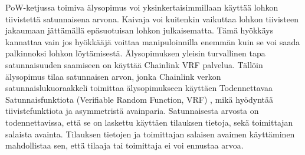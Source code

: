\documentclass{article}
\begin{document}
PoW-ketjussa toimiva älysopimus voi yksinkertaisimmillaan käyttää lohkon tiivistettä satunnaisena arvona. Kaivaja voi kuitenkin vaikuttaa lohkon tiivisteen jakaumaan jättämällä epäsuotuisan lohkon julkaisematta. Tämä hyökkäys kannattaa vain jos hyökkääjä voittaa manipuloinnilla enemmän kuin se voi saada palkinnoksi lohkon löytämisestä. Älysopimuksen yleisin turvallinen tapa satunnaisuuden saamiseen on käyttää Chainlink VRF \cite{noauthor_chainlink_nodate} palvelua. Tällöin älysopimus tilaa satunnaisen arvon, jonka Chainlink verkon satunnaislukuoraakkeli toimittaa älysopimukseen käyttäen Todennettavaa Satunnaisfunktiota (Verifiable Random Function, VRF) \cite{micali_verifiable_1999}, mikä hyödyntää tiivistefunktiota ja asymmetristä avainparia. Satunnaisesta arvosta on todennettavissa, että se on laskettu käyttäen tilauksen tietoja, sekä toimittajan salaista avainta. Tilauksen tietojen ja toimittajan salaisen avaimen käyttäminen mahdollistaa sen, että tilaaja tai toimittaja ei voi ennustaa arvoa.











\end{document}
